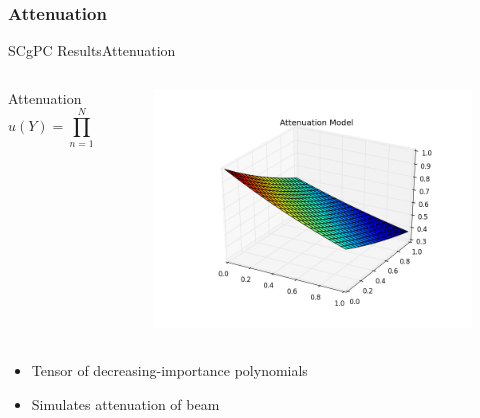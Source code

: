 \documentclass{beamer}
\begin{document}
\subsubsection{Attenuation}
\begin{frame}{SCgPC Results}{Attenuation}\vspace{-20pt}
  \begin{columns}
    \begin{column}{0.6\textwidth}
      \begin{block}{Attenuation}
        \[u(Y) = \prod_{n=1}^N \exp(-y_n/N)\]
      \end{block}
    \end{column}
    \begin{column}{0.4\textwidth}
        \begin{figure}[h!]
          \centering
          \includegraphics[width=\linewidth]{anlmodels/attenuate}
        \end{figure}
    \end{column}
  \end{columns}
  \begin{itemize}
    \item Tensor of decreasing-importance polynomials
    \item Simulates attenuation of beam
  \end{itemize}
\end{frame}
\end{document}

